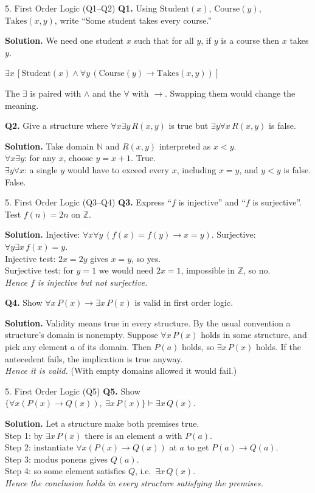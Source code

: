 \documentclass[aspectratio=169,10pt]{beamer}
\newcommand{\qa}[3]{%
  \textbf{Q#1.} #2\par\smallskip
  {\color{ans}\textbf{Solution.} #3}\par\vspace{6pt}}
\begin{document}
\begin{frame}{5. First Order Logic (Q1--Q2)}
\footnotesize
\qa{1}{Using $\mathrm{Student}(x)$, $\mathrm{Course}(y)$, $\mathrm{Takes}(x,y)$, write ``Some student takes every course.''}
{We need one student $x$ such that for all $y$, if $y$ is a course then $x$ takes $y$.\\
\centerline{$\exists x\,[\mathrm{Student}(x)\land\forall y\,(\mathrm{Course}(y)\to\mathrm{Takes}(x,y))]$}
The $\exists$ is paired with $\land$ and the $\forall$ with $\to$. Swapping them would change the meaning.}
\qa{2}{Give a structure where $\forall x\exists y\,R(x,y)$ is true but $\exists y\forall x\,R(x,y)$ is false.}
{Take domain $\mathbb{N}$ and $R(x,y)$ interpreted as $x<y$.\\
$\forall x\exists y$: for any $x$, choose $y=x+1$. True.\\
$\exists y\forall x$: a single $y$ would have to exceed every $x$, including $x=y$, and $y<y$ is false. False.}
\end{frame}

\begin{frame}{5. First Order Logic (Q3--Q4)}
\footnotesize
\qa{3}{Express ``$f$ is injective'' and ``$f$ is surjective''. Test $f(n)=2n$ on $\mathbb{Z}$.}
{Injective: $\forall x\forall y\,(f(x)=f(y)\to x=y)$. Surjective: $\forall y\exists x\,f(x)=y$.\\
Injective test: $2x=2y$ gives $x=y$, so yes.\\
Surjective test: for $y=1$ we would need $2x=1$, impossible in $\mathbb{Z}$, so no.\\
\emph{Hence $f$ is injective but not surjective.}}
\qa{4}{Show $\forall x\,P(x)\to\exists x\,P(x)$ is valid in first order logic.}
{Validity means true in every structure. By the usual convention a structure's domain is nonempty. Suppose $\forall x\,P(x)$ holds in some structure, and pick any element $a$ of its domain. Then $P(a)$ holds, so $\exists x\,P(x)$ holds. If the antecedent fails, the implication is true anyway.\\
\emph{Hence it is valid.} (With empty domains allowed it would fail.)}
\end{frame}

\begin{frame}{5. First Order Logic (Q5)}
\footnotesize
\qa{5}{Show $\{\forall x(P(x)\to Q(x)),\ \exists x\,P(x)\}\models\exists x\,Q(x)$.}
{Let a structure make both premises true.\\
Step 1: by $\exists x\,P(x)$ there is an element $a$ with $P(a)$.\\
Step 2: instantiate $\forall x(P(x)\to Q(x))$ at $a$ to get $P(a)\to Q(a)$.\\
Step 3: modus ponens gives $Q(a)$.\\
Step 4: so some element satisfies $Q$, i.e.\ $\exists x\,Q(x)$.\\
\emph{Hence the conclusion holds in every structure satisfying the premises.}}
\end{frame}
\end{document}
